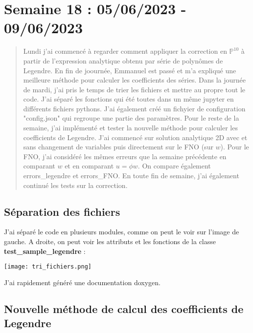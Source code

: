 \section{Semaine 18 : 05/06/2023 - 09/06/2023}
\graphicspath{{semaines/semaine_18/images/}}

\begin{abstract}
	Lundi j'ai commencé à regarder comment appliquer la correction en $\mathbb{P}^{10}$ à partir de l'expression analytique obtenu par série de polynômes de Legendre. En fin de joournée, Emmanuel est passé et m'a expliqué une meilleure méthode pour calculer les coefficients des séries. 
	Dans la journée de mardi, j'ai pris le temps de trier les fichiers et mettre au propre tout le code. J'ai séparé les fonctions qui été toutes dans un même jupyter en différents fichiers pythons. J'ai également créé un fichyier de configuration "config.json" qui regroupe une partie des paramètres.
	Pour le reste de la semaine, j'ai implémenté et tester la nouvelle méthode pour calculer les coefficients de Legendre. J'ai commencé sur solution analytique 2D avec et sans changement de variables puis directement sur le FNO (sur $w$). Pour le FNO, j'ai considéré les mêmes erreurs que la semaine précédente en comparant $w$ et en comparant $u=\phi w$. On compare également errors\_legendre et errors\_FNO.
	En toute fin de semaine, j'ai également continué les tests sur la correction.
\end{abstract}

\subsection{Séparation des fichiers}

J'ai séparé le code en plusieurs modules, comme on peut le voir sur l'image de gauche. A droite, on peut voir les attributs et les fonctions de la classe \textbf{test\_sample\_legendre} :

\begin{minipage}{\linewidth}
	\centering
	\texttt{[image: tri\_fichiers.png]}
\end{minipage}

\begin{Rem}
	J'ai rapidement généré une documentation doxygen.
\end{Rem}

\subsection{Nouvelle méthode de calcul des coefficients de Legendre}

